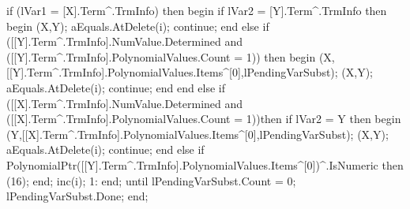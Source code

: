                if (lVar1 = [X].Term^.TrmInfo) then
               begin
                  if lVar2 = [Y].Term^.TrmInfo then
                  begin
                     (X,Y);
                     aEquals.AtDelete(i);
                     continue;
                  end
                  else if ([[Y].Term^.TrmInfo].NumValue.Determined
                           and ([[Y].Term^.TrmInfo].PolynomialValues.Count = 1)) then
                  begin
                     (X,[[Y].Term^.TrmInfo].PolynomialValues.Items^[0],lPendingVarSubst);
                     (X,Y);
                     aEquals.AtDelete(i);
                     continue;
                  end
               end
               else if  ([[X].Term^.TrmInfo].NumValue.Determined
                         and ([[X].Term^.TrmInfo].PolynomialValues.Count = 1))then
                  if lVar2 = Y then
                  begin
                     (Y,[[X].Term^.TrmInfo].PolynomialValues.Items^[0],lPendingVarSubst);
                     (X,Y);
                     aEquals.AtDelete(i);
                     continue;
                  end
                  else if PolynomialPtr([[Y].Term^.TrmInfo].PolynomialValues.Items^[0])^.IsNumeric then
                     (16);
            end;
         inc(i);
         1:
      end;
   until lPendingVarSubst.Count  = 0;
   lPendingVarSubst.Done;
end;
\eatline
